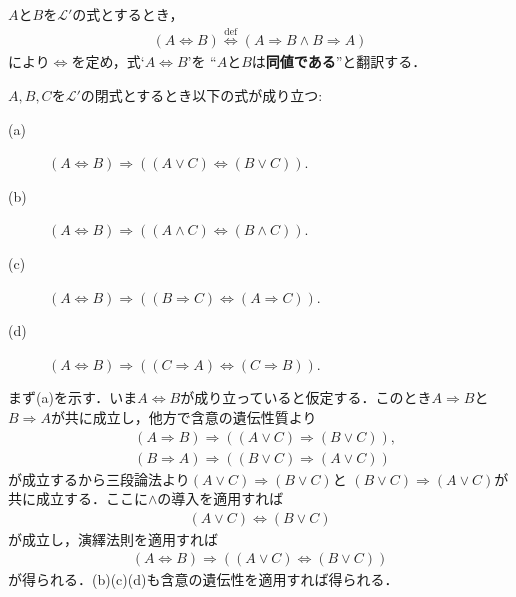 	
	$A$と$B$を$\mathcal{L}'$の式とするとき，
	\begin{align}
		(A \Longleftrightarrow B) \overset{\mathrm{def}}{\Longleftrightarrow}
		(A \Longrightarrow B \wedge B \Longrightarrow A)
	\end{align}
	により$\Longleftrightarrow$を定め，式`$A \Longleftrightarrow B$'を
	``$A$と$B$は{\bf 同値である}''と翻訳する．
	
	\begin{screen}
		\begin{metathm}[同値記号の遺伝性質]\label{metathm:hereditary_of_equivalence}
			$A,B,C$を$\mathcal{L}'$の閉式とするとき以下の式が成り立つ:
			\begin{description}
				\item[(a)] $(A \Longleftrightarrow B) \Longrightarrow ((A \vee C) \Longleftrightarrow (B \vee C))$.
				\item[(b)] $(A \Longleftrightarrow B) \Longrightarrow ((A \wedge C) \Longleftrightarrow (B \wedge C))$.
				\item[(c)] $(A \Longleftrightarrow B) \Longrightarrow ((B \Longrightarrow C) \Longleftrightarrow (A \Longrightarrow C))$.
				
				\item[(d)] $(A \Longleftrightarrow B) \Longrightarrow ((C \Longrightarrow A) \Longleftrightarrow (C \Longrightarrow B))$.
			\end{description}
		\end{metathm}
	\end{screen}
	
	\begin{prf}
		まず(a)を示す．いま$A \Longleftrightarrow B$が成り立っていると仮定する．このとき$A \Longrightarrow B$と
		$B \Longrightarrow A$が共に成立し，他方で含意の遺伝性質より
		\begin{align}
			&(A \Longrightarrow B) \Longrightarrow ((A \vee C) \Longrightarrow (B \vee C)), \\
			&(B \Longrightarrow A) \Longrightarrow ((B \vee C) \Longrightarrow (A \vee C))
		\end{align}
		が成立するから三段論法より$(A \vee C) \Longrightarrow (B \vee C)$と
		$(B \vee C) \Longrightarrow (A \vee C)$が共に成立する．ここに$\wedge$の導入を適用すれば
		\begin{align}
			(A \vee C) \Longleftrightarrow (B \vee C)
		\end{align}
		が成立し，演繹法則を適用すれば
		\begin{align}
			(A \Longleftrightarrow B) \Longrightarrow ((A \vee C) \Longleftrightarrow (B \vee C))
		\end{align}
		が得られる．(b)(c)(d)も含意の遺伝性を適用すれば得られる．
		\QED
	\end{prf}
	
